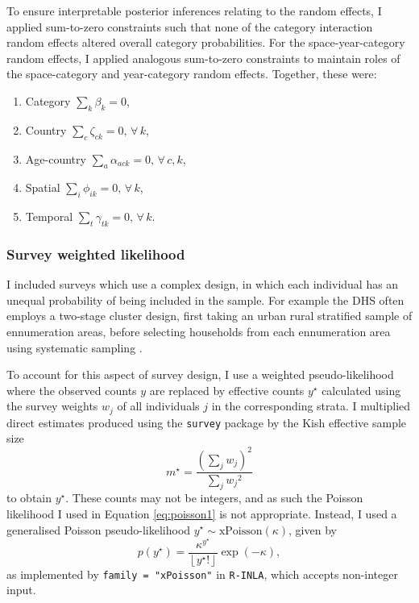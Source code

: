 \documentclass[a4paper, nobind]{templates/ociamthesis}
\providecommand{\tightlist}{%
  \setlength{\itemsep}{0pt}\setlength{\parskip}{0pt}}
\begin{document}
To ensure interpretable posterior inferences relating to the random effects, I applied sum-to-zero constraints such that none of the category interaction random effects altered overall category probabilities.
For the space-year-category random effects, I applied analogous sum-to-zero constraints to maintain roles of the space-category and year-category random effects.
Together, these were:

\begin{enumerate}
\def\labelenumi{\arabic{enumi}.}
\tightlist
\item
  Category \(\sum_k \beta_k = 0\),
\item
  Country \(\sum_c \zeta_{ck} = 0, \, \forall \, k\),
\item
  Age-country \(\sum_a \alpha_{ack} = 0, \, \forall \, c, k\),
\item
  Spatial \(\sum_i \phi_{ik} = 0, \, \forall \, k\),
\item
  Temporal \(\sum_t \gamma_{tk} = 0, \, \forall \, k\).
\end{enumerate}

\hypertarget{survey-weighted-likelihood}{%
\subsubsection{Survey weighted likelihood}\label{survey-weighted-likelihood}}

I included surveys which use a complex design, in which each individual has an unequal probability of being included in the sample.
For example the DHS often employs a two-stage cluster design, first taking an urban rural stratified sample of ennumeration areas, before selecting households from each ennumeration area using systematic sampling \autocite{measure2012sampling}.

To account for this aspect of survey design, I use a weighted pseudo-likelihood where the observed counts \(y\) are replaced by effective counts \(y^\star\) calculated using the survey weights \(w_j\) of all individuals \(j\) in the corresponding strata.
I multiplied direct estimates produced using the \texttt{survey} package \autocite{JSSv009i08} by the Kish effective sample size \autocite{kish1965survey}
\begin{equation}
    m^\star = \frac{\left(\sum_j w_j \right)^2}{\sum_j {w_j}^2}
\end{equation}
to obtain \(y^\star\).
These counts may not be integers, and as such the Poisson likelihood I used in Equation \ref{eq:poisson1} is not appropriate.
Instead, I used a generalised Poisson pseudo-likelihood \(y^\star \sim \text{xPoisson}(\kappa)\), given by
\begin{equation}
    p(y^\star) = \frac{\kappa^{y^\star}}{\left \lfloor{y^\star!}\right \rfloor } \exp \left(- \kappa \right),
\end{equation}
as implemented by \texttt{family\ =\ "xPoisson"} in \texttt{R-INLA}, which accepts non-integer input.
\end{document}
